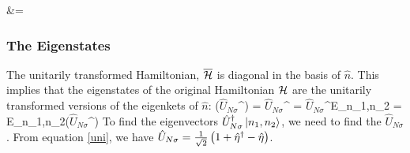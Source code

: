 \documentclass[12pt]{article}
\newcommand{\un}{\ensuremath{\hat{U}_{N\sigma}}}
\begin{document}
\beq
\overline \ham &= 
\eeq
\subsubsection{The Eigenstates}
The unitarily transformed Hamiltonian, \(\overline {\mathcal{H}}\) is diagonal in the basis of \(\hat n\). This implies that the eigenstates of the original Hamiltonian \(\mathcal{H}\) are the unitarily transformed versions of the eigenkets of \(\hat n\):
\beq
\ham (\un^\dagger {}) = \un^\dagger \overline \ham {} = \un^\dagger E_{n_1,n_2} = E_{n_1,n_2}(\un^\dagger{})
\eeq
To find the eigenvectors \(\un^\dagger\ket{n_1,n_2}\), we need to find the \(\un\). From equation \ref{uni}, we have \(\un = \fr{1}{\sqrt 2}\rr{1+\hat \eta^\dagger - \hat \eta}\). 
\end{document}
